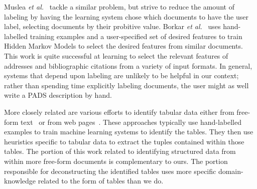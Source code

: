 Muslea {\em et al.}~\cite{muslea+:active-learning} tackle a similar
problem, but strive to reduce the amount of labeling by having the
learning system chose which documents to have the user label,
selecting documents by their probitive value.  Borkar {\em et
al.}~\cite{borkar+:text-segmentation} uses hand-labelled training
examples and a user-specified set of desired features to train Hidden
Markov Models to select the desired features from similar documents.
This work is quite successful at learning to select the relevant
features of addresses and bibliographic citations from a variety of
input formats. 
In general, systems that depend
upon labeling are unlikely to be helpful in our context; rather than
spending time explicitly labeling documents, the user might as well
write a PADS description by hand.


More closely related are various efforts to identify tabular data 
either from free-form text~\cite{Ng+:texttables,Pinto+:texttables} or
from web pages~\cite{Lerman+:webtables}.  These approaches typically
use hand-labelled examples to train machine learning systems to
identify the tables.  They then use heuristics specific to tabular
data to extract the tuples contained within those tables.  The portion
of this work related to identifying structured data from within more
free-form documents is complementary to ours.  The portion responsible
for deconstructing the identified tables uses more specific
domain-knowledge related to the form of tables than we do.


